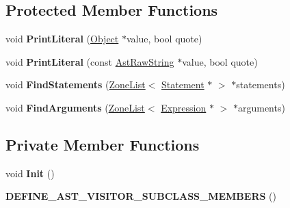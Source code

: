 \subsection*{Protected Member Functions}
\begin{DoxyCompactItemize}
\item 
void {\bfseries Print\+Literal} (\hyperlink{classv8_1_1internal_1_1_object}{Object} $\ast$value, bool quote)\hypertarget{classv8_1_1internal_1_1_call_printer_a315b230b68e4db1b87c75e0e22e3d89c}{}\label{classv8_1_1internal_1_1_call_printer_a315b230b68e4db1b87c75e0e22e3d89c}

\item 
void {\bfseries Print\+Literal} (const \hyperlink{classv8_1_1internal_1_1_ast_raw_string}{Ast\+Raw\+String} $\ast$value, bool quote)\hypertarget{classv8_1_1internal_1_1_call_printer_a05c24b0df6390ca4a79d0b639853a19c}{}\label{classv8_1_1internal_1_1_call_printer_a05c24b0df6390ca4a79d0b639853a19c}

\item 
void {\bfseries Find\+Statements} (\hyperlink{classv8_1_1internal_1_1_zone_list}{Zone\+List}$<$ \hyperlink{classv8_1_1internal_1_1_statement}{Statement} $\ast$ $>$ $\ast$statements)\hypertarget{classv8_1_1internal_1_1_call_printer_a9d7b1c31f01c76921d92c54da8dd36c0}{}\label{classv8_1_1internal_1_1_call_printer_a9d7b1c31f01c76921d92c54da8dd36c0}

\item 
void {\bfseries Find\+Arguments} (\hyperlink{classv8_1_1internal_1_1_zone_list}{Zone\+List}$<$ \hyperlink{classv8_1_1internal_1_1_expression}{Expression} $\ast$ $>$ $\ast$arguments)\hypertarget{classv8_1_1internal_1_1_call_printer_a6bb6ec75e2ec490c09955cc8a20a35cd}{}\label{classv8_1_1internal_1_1_call_printer_a6bb6ec75e2ec490c09955cc8a20a35cd}

\end{DoxyCompactItemize}
\subsection*{Private Member Functions}
\begin{DoxyCompactItemize}
\item 
void {\bfseries Init} ()\hypertarget{classv8_1_1internal_1_1_call_printer_acdb597fa9a2b7a448501638aea83a39e}{}\label{classv8_1_1internal_1_1_call_printer_acdb597fa9a2b7a448501638aea83a39e}

\item 
{\bfseries D\+E\+F\+I\+N\+E\+\_\+\+A\+S\+T\+\_\+\+V\+I\+S\+I\+T\+O\+R\+\_\+\+S\+U\+B\+C\+L\+A\+S\+S\+\_\+\+M\+E\+M\+B\+E\+RS} ()\hypertarget{classv8_1_1internal_1_1_call_printer_a9801f6f97de2215f25630bca21ecb701}{}\label{classv8_1_1internal_1_1_call_printer_a9801f6f97de2215f25630bca21ecb701}

\end{DoxyCompactItemize}
